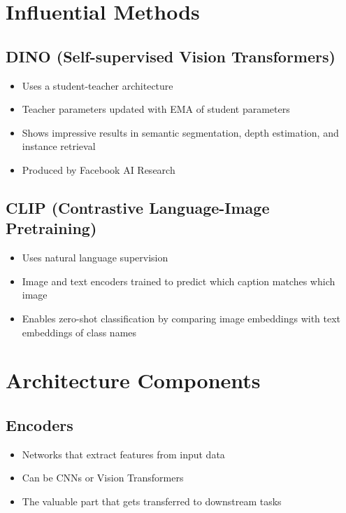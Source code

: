 \section*{Influential Methods}

\subsection*{DINO (Self-supervised Vision Transformers)}
\begin{itemize}
    \item Uses a student-teacher architecture
    \item Teacher parameters updated with EMA of student parameters
    \item Shows impressive results in semantic segmentation, depth estimation, and instance retrieval
    \item Produced by Facebook AI Research
\end{itemize}

\subsection*{CLIP (Contrastive Language-Image Pretraining)}
\begin{itemize}
    \item Uses natural language supervision
    \item Image and text encoders trained to predict which caption matches which image
    \item Enables zero-shot classification by comparing image embeddings with text embeddings of class names
\end{itemize}

\section*{Architecture Components}

\subsection*{Encoders}
\begin{itemize}
    \item Networks that extract features from input data
    \item Can be CNNs or Vision Transformers
    \item The valuable part that gets transferred to downstream tasks
\end{itemize}

